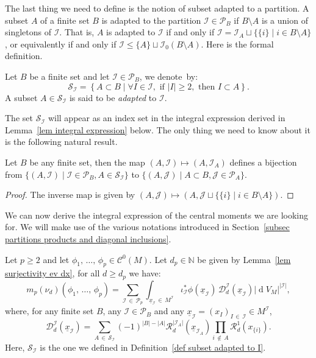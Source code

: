 \documentclass[AHL,Unicode,longabstracts,published]{cedram}
\DeclareMathOperator{\dmesure}{d}
\newcommand{\D}{\mathcal{D}}
\newcommand{\I}{\mathcal{I}}
\newcommand{\J}{\mathcal{J}}
\newcommand{\clC}{\mathcal{C}}
\newcommand{\clR}{\mathcal{R}}
\newcommand{\clS}{\mathcal{S}}
\newcommand{\pa}{\mathcal{P}\!}
\newcommand{\N}{\mathbb{N}}
\newcommand{\norm}[1]{\left\lvert #1 \right\rvert}
\renewcommand{\geq}{\geqslant}
\renewcommand{\leq}{\leqslant}
\let\oldforall\forall
\renewcommand*{\forall}{\mathrel{\oldforall}}
\begin{document}
The last thing we need to define is the notion of subset adapted to a partition. A subset $A$ of a finite set $B$ is adapted to the partition $\I \in \pa_B$ if $B \setminus A$ is a union of singletons of $\I$. That is, $A$ is adapted to $\I$ if and only if $\I = \I_A \sqcup \{\{i\} \mid i \in B \setminus A\}$, or equivalently if and only if $\I \leq \{A\} \sqcup \I_0(B \setminus A)$. Here is the formal definition.

\begin{defi}\label{def subset adapted to I}
Let $B$ be a finite set and let $\I \in \pa_B$, we denote~by:
\[
\clS_\I = \left\{A \subset B \middle\vert \forall I \in \I, \text{ if } \norm{I} \geq 2, \text{ then } I \subset A \right\}.
\]
A subset $A \in \clS_\I$ is said to be \emph{adapted} to $\I$.
\end{defi}

The set $\clS_\I$ will appear as an index set in the integral expression derived in Lemma~\ref{lem integral expression} below. The only thing we need to know about it is the following natural result.

\begin{lemm}\label{lem subsets adapted to I}
Let $B$ be any finite set, then the map $(A,\I) \mapsto (A,\I_A)$ defines a bijection from $\{(A,\I) \mid \I\in \pa_B, A \in \clS_\I \}$ to $\{ (A,\J) \mid A \subset B, \J \in \pa_A \}$.
\end{lemm}

\begin{proof}
The inverse map is given by $(A,\J) \mapsto (A, \J \sqcup \{\{i\} \mid i \in B \setminus A\})$.
\end{proof}

We can now derive the integral expression of the central moments we are looking for. We will make use of the various notations introduced in Section~\ref{subsec partitions products and diagonal inclusions}.

\begin{lemm}\label{lem integral expression}
Let $p \geq 2$ and let $\phi_1,\,\dots,\,\phi_p \in \clC^0(M)$. Let $d_p \in \N$ be given by Lemma~\ref{lem surjectivity ev dx}, for all $d \geq d_p$ we have:
\[
m_p(\nu_d)\left(\phi_1,\,\dots,\,\phi_p\right)= \sum_{\I\,\in\,\pa_p} \int_{\underline{x}_\I\,\in\,M^\I} \iota_\I^*\phi\left(\underline{x}_\I\right)\, \D^\I_d\left(\underline{x}_\I\right) \left|\dmesure\! V_{M}\right|^{\norm{\I}},
\]
where, for any finite set $B$, any $\I \in \pa_B$ and any $\underline{x}_\I = (x_I)_{I\,\in\,\I} \in M^\I$,
\[
\D^\I_d\left(\underline{x}_\I\right) = \sum_{A\,\in\,\clS_\I} (-1)^{\norm{B} - \norm{A}} \clR_d^{\norm{\I_A}}\left(\underline{x}_{\I_A}\right) \prod_{i\,\notin\,A} \clR_d^1\left(x_{\{i\}}\right).
\]
Here, $\clS_\I$ is the one we defined in Definition~\ref{def subset adapted to I}.
\end{lemm}
\end{document}

